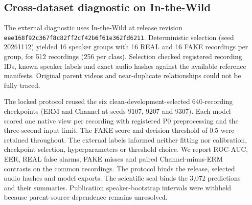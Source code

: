\subsection{Cross-dataset diagnostic on In-the-Wild}\label{sec:r08-methods}
The external diagnostic uses In-the-Wild \cite{wild} at release revision \texttt{eee168f9}\allowbreak \texttt{2c367f8c}\allowbreak \texttt{82ff2cf4}\allowbreak \texttt{2b6f61e3}\allowbreak \texttt{62fd6211}. Deterministic selection (seed 20261112) yielded 16 speaker groups with 16 REAL and 16 FAKE recordings per group, for 512 recordings (256 per class). Selection checked registered recording IDs, known speaker labels and exact audio hashes against the available reference manifests. Original parent videos and near-duplicate relationships could not be fully traced.

The locked protocol reused the six clean-development-selected 640-recording checkpoints (ERM and Channel at seeds 9107, 9207 and 9307). Each model scored one native view per recording with registered P0 preprocessing and the three-second input limit. The FAKE score and decision threshold of 0.5 were retained throughout. The external labels informed neither fitting nor calibration, checkpoint selection, hyperparameters or threshold choice. We report ROC-AUC, EER, REAL false alarms, FAKE misses and paired Channel-minus-ERM contrasts on the common recordings. The protocol binds the release, selected audio hashes and model exports. The scientific seal binds the 3,072 predictions and their summaries. Publication speaker-bootstrap intervals were withheld because parent-source dependence remains unresolved.
